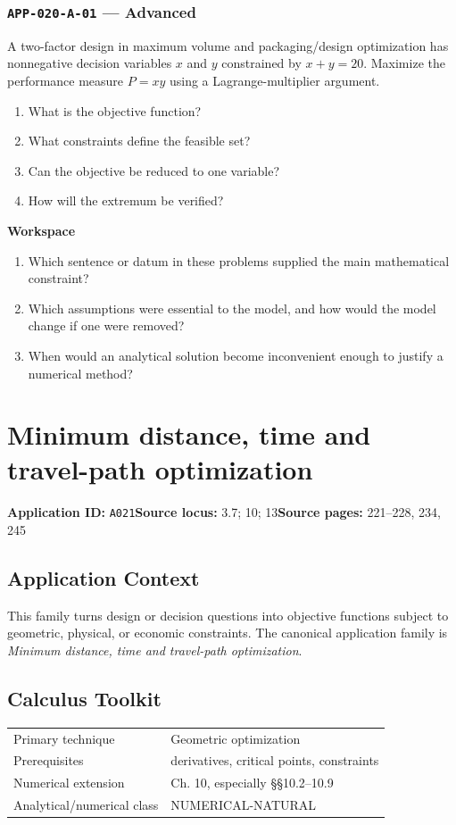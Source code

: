 \documentclass[11pt]{book}
\newcommand{\pid}[1]{\texttt{#1}}
\newcommand{\workspace}{\par\vspace{0.7in}\hrulefill\par\vspace{0.55in}\hrulefill\par}
\begin{document}
\subsection*{\pid{APP-020-A-01} — Advanced}
\begin{problembox}
A two-factor design in maximum volume and packaging/design optimization has nonnegative decision variables $x$ and $y$ constrained by $x+y=20$. Maximize the performance measure $P=xy$ using a Lagrange-multiplier argument.
\end{problembox}
\begin{promptbox}\begin{enumerate}
\item What is the objective function?
\item What constraints define the feasible set?
\item Can the objective be reduced to one variable?
\item How will the extremum be verified?
\end{enumerate}\end{promptbox}
\textbf{Workspace}\workspace
\begin{reflectionbox}\begin{enumerate}
\item Which sentence or datum in these problems supplied the main mathematical constraint?
\item Which assumptions were essential to the model, and how would the model change if one were removed?
\item When would an analytical solution become inconvenient enough to justify a numerical method?
\end{enumerate}\end{reflectionbox}
\chapter{Minimum distance, time and travel-path optimization}\label{app:A021}
\textbf{Application ID:} \pid{A021}\quad \textbf{Source locus:} 3.7; 10; 13\quad \textbf{Source pages:} 221–228, 234, 245
\section*{Application Context}
This family turns design or decision questions into objective functions subject to geometric, physical, or economic constraints. The canonical application family is \emph{Minimum distance, time and travel-path optimization}.
\section*{Calculus Toolkit}
\begin{tabularx}{\textwidth}{@{}lX@{}}\toprule
Primary technique & Geometric optimization \\
Prerequisites & derivatives, critical points, constraints \\
Numerical extension & Ch. 10, especially §§10.2–10.9 \\
Analytical/numerical class & NUMERICAL-NATURAL \\
\bottomrule\end{tabularx}
\end{document}
